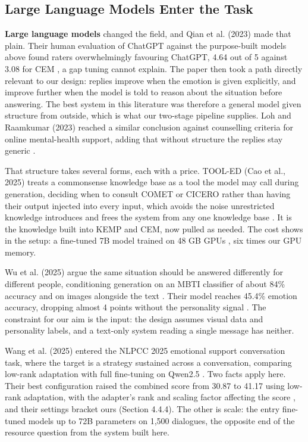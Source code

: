 \subsection{Large Language Models Enter the Task}
\label{sec:2.2.4}

\textbf{Large language models} changed the field, and Qian et al. (2023) made that plain. Their human evaluation of ChatGPT against the purpose-built models above found raters overwhelmingly favouring ChatGPT, 4.64 out of 5 against 3.08 for CEM \cite{qian2023llm}, a gap tuning cannot explain. The paper then took a path directly relevant to our design: replies improve when the emotion is given explicitly, and improve further when the model is told to reason about the situation before answering. The best system in this literature was therefore a general model given structure from outside, which is what our two-stage pipeline supplies. Loh and Raamkumar (2023) reached a similar conclusion against counselling criteria for online mental-health support, adding that without structure the replies stay generic \cite{loh2023harnessing}.

That structure takes several forms, each with a price. TOOL-ED (Cao et al., 2025) treats a commonsense knowledge base as a tool the model may call during generation, deciding when to consult COMET or CICERO rather than having their output injected into every input, which avoids the noise unrestricted knowledge introduces and frees the system from any one knowledge base \cite{cao2025tooled}. It is the knowledge built into KEMP and CEM, now pulled as needed. The cost shows in the setup: a fine-tuned 7B model trained on 48 GB GPUs \cite{cao2025tooled}, six times our GPU memory.

Wu et al. (2025) argue the same situation should be answered differently for different people, conditioning generation on an MBTI classifier of about 84\% accuracy and on images alongside the text \cite{wu2025traits}. Their model reaches 45.4\% emotion accuracy, dropping almost 4 points without the personality signal \cite{wu2025traits}. The constraint for our aim is the input: the design assumes visual data and personality labels, and a text-only system reading a single message has neither.

Wang et al. (2025) entered the NLPCC 2025 emotional support conversation task, where the target is a strategy sustained across a conversation, comparing low-rank adaptation with full fine-tuning on Qwen2.5 \cite{wang2025esc}. Two facts apply here. Their best configuration raised the combined score from 30.87 to 41.17 using low-rank adaptation, with the adapter's rank and scaling factor affecting the score \cite{wang2025esc}, and their settings bracket ours (Section 4.4.4). The other is scale: the entry fine-tuned models up to 72B parameters on 1,500 dialogues, the opposite end of the resource question from the system built here.

